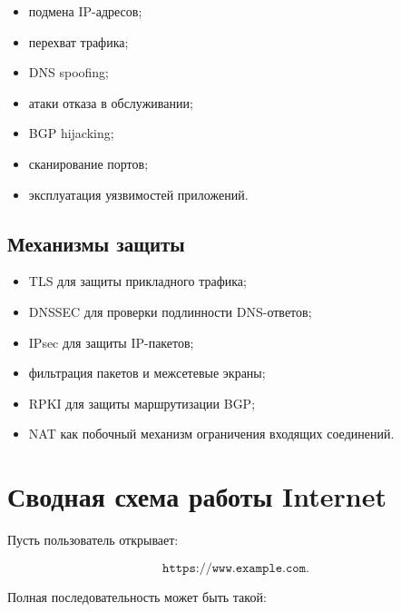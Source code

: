 \documentclass[12pt,a4paper]{article}
\begin{document}
\begin{itemize}
    \item подмена IP-адресов;
    \item перехват трафика;
    \item DNS spoofing;
    \item атаки отказа в обслуживании;
    \item BGP hijacking;
    \item сканирование портов;
    \item эксплуатация уязвимостей приложений.
\end{itemize}

\subsection{Механизмы защиты}

\begin{itemize}
    \item TLS для защиты прикладного трафика;
    \item DNSSEC для проверки подлинности DNS-ответов;
    \item IPsec для защиты IP-пакетов;
    \item фильтрация пакетов и межсетевые экраны;
    \item RPKI для защиты маршрутизации BGP;
    \item NAT как побочный механизм ограничения входящих соединений.
\end{itemize}

\section{Сводная схема работы Internet}

Пусть пользователь открывает:

\[
\texttt{https://www.example.com}.
\]

Полная последовательность может быть такой:
\end{document}
